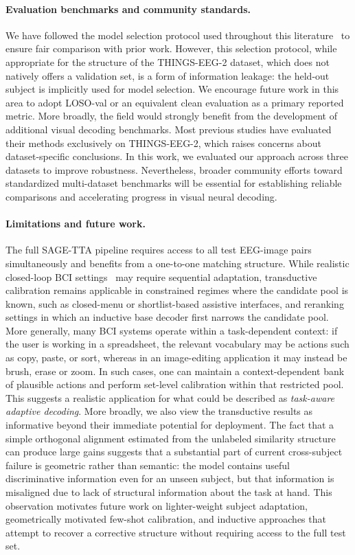 \documentclass{article}
\begin{document}
\paragraph{Evaluation benchmarks and community standards.}
We have followed the model selection protocol used throughout this literature~\cite{zhang2025neurobridge,du2025shallow} to ensure fair comparison with prior work.
However, this selection protocol, while appropriate for the structure of the THINGS-EEG-2 dataset, which does not natively offers a validation set, is a form of information leakage: the held-out subject is implicitly used for model selection. We encourage future work in this area to adopt LOSO-val or an equivalent clean evaluation as a primary reported metric. More broadly, the field would strongly benefit from the development of additional visual decoding benchmarks. Most previous studies have evaluated their methods exclusively on THINGS-EEG-2, which raises concerns about dataset-specific conclusions. In this work, we evaluated our approach across three datasets to improve robustness. Nevertheless, broader community efforts toward standardized multi-dataset benchmarks will be essential for establishing reliable comparisons and accelerating progress in visual neural decoding.

\paragraph{Limitations and future work.}
The full SAGE-TTA pipeline requires access to all test EEG-image pairs simultaneously and benefits from a one-to-one matching structure.
While realistic closed-loop BCI settings~\cite{lawhern2018eegnet} may require sequential adaptation, transductive calibration remains applicable in constrained regimes where the candidate pool is known, such as closed-menu or shortlist-based assistive interfaces, and reranking settings in which an inductive base decoder first narrows the candidate pool. More generally, many BCI systems operate within a task-dependent context: if the user is working in a spreadsheet, the relevant vocabulary may be actions such as copy, paste, or sort, whereas in an image-editing application it may instead be brush, erase or zoom. In such cases, one can maintain a context-dependent bank of plausible actions and perform set-level calibration within that restricted pool. This suggests a realistic application for what could be described as \emph{task-aware adaptive decoding}. More broadly, we also view the transductive results as informative beyond their immediate potential for deployment. The fact that a simple orthogonal alignment estimated from the unlabeled similarity structure can produce large gains suggests that a substantial part of current cross-subject failure is geometric rather than semantic: the model contains useful discriminative information even for an unseen subject, but that information is misaligned due to lack of structural information about the task at hand. This observation motivates future work on lighter-weight subject adaptation, geometrically motivated few-shot calibration, and inductive approaches that attempt to recover a corrective structure without requiring access to the full test set.
\end{document}
